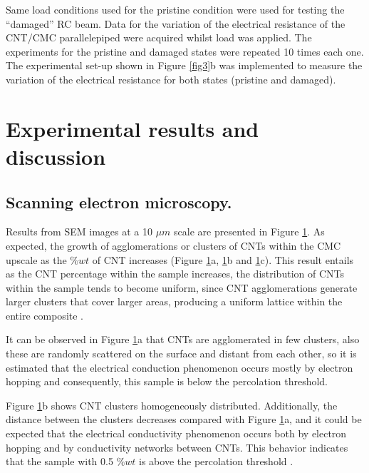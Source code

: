 \documentclass[twocolumn]{bmcart}%
\begin{document}
Same load conditions used for the pristine condition were used for testing the “damaged” RC beam. Data for the variation of the electrical resistance of the CNT/CMC parallelepiped were acquired whilst load was applied. The experiments for the pristine and damaged states were repeated 10 times each one. The experimental set-up shown in Figure \ref{fig3}b was implemented to measure the variation of the electrical resistance for both states (pristine and damaged).

\section{Experimental results and discussion}

\subsection{Scanning electron microscopy.}

Results from SEM images at a 10 $\mu m$ scale are presented in Figure \ref{fig7}. As expected, the growth of agglomerations or clusters of CNTs within the CMC upscale as the $\%wt$ of CNT increases (Figure \ref{fig7}a, \ref{fig7}b and \ref{fig7}c). This result entails as the CNT percentage within the sample increases, the distribution of CNTs within the sample tends to become uniform, since CNT agglomerations generate larger clusters that cover larger areas, producing a uniform lattice within the entire composite \cite{Garcia-Macias2017, Nam2015}.

\begin{figure}[h!]
  \caption{
      }
      \label{fig7}
      \end{figure}


It can be observed in Figure \ref{fig7}a that CNTs are agglomerated in few clusters, also these are randomly scattered on the surface and distant from each other, so it is estimated that the electrical conduction phenomenon occurs mostly by electron hopping \cite{Balberg1984, Garcia-Macias2017} and consequently, this sample is below the percolation threshold.

Figure \ref{fig7}b shows CNT clusters homogeneously distributed. Additionally, the distance between the clusters decreases compared with Figure \ref{fig7}a, and it could be expected that the electrical conductivity phenomenon occurs both by electron hopping and by conductivity networks between CNTs. This behavior indicates that the sample with 0.5 $\%wt$ is above the percolation threshold \cite{Balberg1984, Garcia-Macias2017}.
\end{document}
